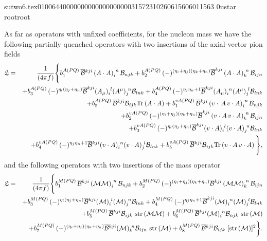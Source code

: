                                                                                                                                                                                                                                                                                       sutwo6.tex                                                                                          0100644 0000000 0000000 00000315723 10260615606 011563  0                                                                                                    ustar   root                            root                                                                                                                                                                                                                   \documentclass[prd,amssymb,amsmath,showpacs,nofootinbib,superscriptaddress]{revtex4}
\begin{document}
As far as operators with unfixed coefficients, for the nucleon mass we have the 
following partially quenched operators with two insertions of the axial-vector
pion fields
\begin{eqnarray}
\mathfrak{L} &=& \frac{1}{( 4\pi f)}\Bigg\{
        b^{A(PQ)}_1\, {\overline{{\mathcal B}}}{}^{kji} \left( A\cdot A \right)_i^{\hskip0.3em n} 
               {\mathcal B}_{njk}
        + b^{A(PQ)}_2\, (-)^{(\eta_i+\eta_j)(\eta_k+\eta_n)} {\overline{{\mathcal B}}}^{kji}
           \left( A\cdot A \right)_k^{\hskip0.3em n} {\mathcal B}_{ijn} \nonumber\\
       && 
        + b^{A(PQ)}_3\, (-)^{\eta_l(\eta_j+\eta_n)} {\overline{{\mathcal B}}}^{kji} (A_\mu
             )_i^{\hskip0.3em l} (A^\mu )_j^{\hskip0.3em n} {\mathcal B}_{lnk} 
+ 
b_4^{A (PQ)} \, (-)^{\eta_j \eta_n + 1} {\overline{{\mathcal B}}}^{kji} 
(A_\mu)_i^{\hskip0.3em n} (A^\mu )_j^{\hskip0.3em l} {\mathcal B}_{lnk} 
\notag \\
&& + 
b^{A(PQ)}_5\, {\overline{{\mathcal B}}}{}^{kji} {\mathcal B}_{ijk} {\rm Tr}\left( A\cdot A \right)
+ 
b^{vA (PQ)}_1\, {\overline{{\mathcal B}}}{}^{kji} \left( v\cdot\, A\, v\cdot A \right)_i^{\hskip0.3em n} {\mathcal B}_{njk}
\notag \\
&& + 
b^{vA (PQ)}_2\, (-)^{(\eta_i+\eta_j)(\eta_k+\eta_n)} {\overline{{\mathcal B}}}^{kji}
\left( v\cdot A\, v\cdot A \right)_k^{\hskip0.3emn} {\mathcal B}_{ijn} 
\notag \\
&& +
b^{vA (PQ)}_3\, (-)^{\eta_l(\eta_j+\eta_n)} {\overline{{\mathcal B}}}^{kji} 
(v\cdot A )_i^{\hskip0.3em l} (v\cdot A )_j^{\hskip0.3em n} {\mathcal B}_{lnk} 
\notag \\
&& +
b_4^{vA (PQ)} \, (-)^{\eta_j \eta_n + 1} {\overline{{\mathcal B}}} {}^{kji} 
(v \cdot A)_i^{\hskip0.3em n} (v \cdot A )_j^{\hskip0.3em l} {\mathcal B}_{lnk} 
+ 
b^{vA (PQ)}_5\, {\overline{{\mathcal B}}}{}^{kji} {\mathcal B}_{ijk} {\rm Tr}\left( v\cdot A\, v\cdot A \right) 
\label{eq:NhdoPQ} \Bigg\},
\end{eqnarray}
and the following operators with two insertions of the mass operator
\begin{eqnarray}
\mathfrak{L} &=& \frac{1}{( 4\pi f)}\Bigg\{
b^{M \pq}_1\, \ol{\c{B}}{}^{kji} \left( \c{M} \c{M} \right)_i^{\hskip0.3em n} \c{B}_{njk}
+ 
b^{M \pq}_2 \, (-)^{(\eta_i+\eta_j)(\eta_k+\eta_n)}
\ol{\c{B}}{}^{kji} \left( \c{M} \c{M} \right)_k^{\hskip0.3em n} 
               \c{B}_{ijn} \nonumber\\
&& + 
b^{M \pq}_3 \, (-)^{\eta_l(\eta_j+\eta_n)}
               \ol{\c{B}}{}^{kji} (\c{M})_i^{\hskip0.3em l}
               (\c{M})_j^{\hskip0.3em n} \c{B}_{lnk} 
+
b_4^{M \pq} \, (-)^{\eta_j \eta_n + 1 } 
\ol{\c{B}}^{kji} (\c{M})_i^{\hskip0.3em n} (\c{M})_j^{\hskip0.3em l} \c{B}_{lnk} 
\notag \\
&& + 
b^{M \pq}_5\, \ol{\c{B}}{}^{kji} \c{B}_{ijk}\ {\rm str}\left(\c{M}
               \c{M} \right) 
+
b^{M \pq}_6\, \ol{\c{B}}{}^{kji} (\c{M})_i^{\hskip0.3em n} \c{B}_{njk}\ 
               {\rm str}\left( \c{M} \right) 
\notag \\
&& + 
b^{M \pq}_7\, (-)^{(\eta_i+\eta_j)(\eta_k+\eta_n)}
               \ol{\c{B}}{}^{kji} (\c{M})_k^{\hskip0.3em n} \c{B}_{ijn}\ 
               {\rm str}\left( \c{M} \right)
+ 
b^{M \pq}_8 \, \ol{\c{B}}{}^{kji} \c{B}_{ijk}\ [{\rm str}\left( \c{M} \right)]^2
\bigg\}.
\notag \\
\end{eqnarray}%
\end{document}
